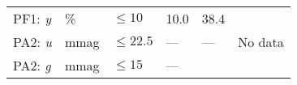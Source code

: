 \documentclass[DM,lsstdraft,toc]{lsstdoc}
\begin{document}
\begin{longtable}[]{@{}llllll@{}}
\begin{minipage}[t]{0.14\columnwidth}
PF1: \emph{y}\strut
\end{minipage} & \begin{minipage}[t]{0.06\columnwidth}\raggedright\strut
\%\strut
\end{minipage} & \begin{minipage}[t]{0.17\columnwidth}\raggedright\strut
\(\leq 10\)\strut
\end{minipage} & \begin{minipage}[t]{0.17\columnwidth}\raggedright\strut
10.0\strut
\end{minipage} & \begin{minipage}[t]{0.12\columnwidth}\raggedright\strut
38.4\strut
\end{minipage} & \begin{minipage}[t]{0.17\columnwidth}\raggedright\strut
\strut
\end{minipage}\tabularnewline
\begin{minipage}[t]{0.14\columnwidth}\raggedright\strut
PA2: \emph{u}\strut
\end{minipage} & \begin{minipage}[t]{0.06\columnwidth}\raggedright\strut
mmag\strut
\end{minipage} & \begin{minipage}[t]{0.17\columnwidth}\raggedright\strut
\(\leq 22.5\)\strut
\end{minipage} & \begin{minipage}[t]{0.17\columnwidth}\raggedright\strut
---\strut
\end{minipage} & \begin{minipage}[t]{0.12\columnwidth}\raggedright\strut
---\strut
\end{minipage} & \begin{minipage}[t]{0.17\columnwidth}\raggedright\strut
No data\strut
\end{minipage}\tabularnewline
\begin{minipage}[t]{0.14\columnwidth}\raggedright\strut
PA2: \emph{g}\strut
\end{minipage} & \begin{minipage}[t]{0.06\columnwidth}\raggedright\strut
mmag\strut
\end{minipage} & \begin{minipage}[t]{0.17\columnwidth}\raggedright\strut
\(\leq 15\)\strut
\end{minipage} & \begin{minipage}[t]{0.17\columnwidth}\raggedright\strut
---\strut
\end{minipage} & \begin{minipage}[t]{0.12\columnwidth}\raggedright\strut

\end{minipage}
\end{longtable}
\end{document}
